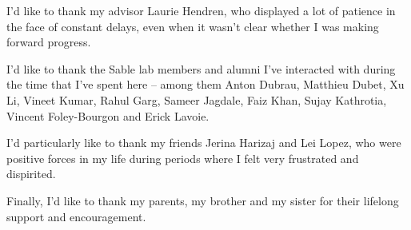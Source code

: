 I'd like to thank my advisor Laurie Hendren, who displayed a lot of patience in
the face of constant delays, even when it wasn't clear whether I was making
forward progress.

I'd like to thank the Sable lab members and alumni I've interacted with during
the time that I've spent here -- among them Anton Dubrau, Matthieu Dubet, Xu Li,
Vineet Kumar, Rahul Garg, Sameer Jagdale, Faiz Khan, Sujay Kathrotia, Vincent
Foley-Bourgon and Erick Lavoie.

I'd particularly like to thank my friends Jerina Harizaj and Lei Lopez, who
were positive forces in my life during periods where I felt very frustrated and
dispirited.

Finally, I'd like to thank my parents, my brother and my sister for their
lifelong support and encouragement.
